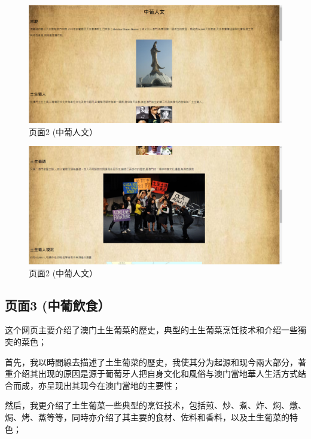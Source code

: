 \documentclass[supercite]{Experimental_Report}
\theoremstyle{definition}
\begin{document}
	
	\begin{figure}[htb]
		\begin{center}
			\includegraphics[scale=0.30]{images/3-2.jpg}
			\caption{页面2 (中葡人文）}
			\label{fig3-2}
		\end{center}
	\end{figure}
	\begin{figure}[htb]
		\begin{center}
			\includegraphics[scale=0.30]{images/3-2-1.jpg}
			\caption{页面2 (中葡人文）}
			\label{fig3-2-1}
		\end{center}
	\end{figure}
	\subsection{页面3 (中葡飲食）}
	这个网页主要介绍了澳门土生葡菜的歷史，典型的土生葡菜烹饪技术和介绍一些獨突的菜色；
	
	首先，我以時間線去描述了土生葡菜的歷史，我使其分为起源和现今兩大部分，著重介绍其出现的原因是源于葡萄牙人把自身文化和風俗与澳门當地華人生活方式结合而成，亦呈现出其现今在澳门當地的主要性；
	
	然后，我更介绍了土生葡菜一些典型的烹饪技术，包括煎、炒、煮、炸、焖、燉、焗、烤、蒸等等，同時亦介绍了其主要的食材、佐料和香料，以及土生葡菜的特色；
	
\end{document}
